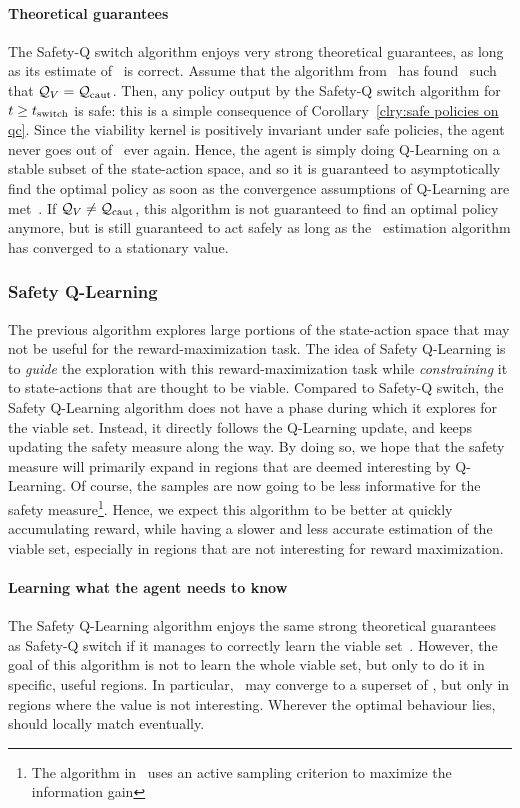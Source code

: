 \paragraph{Theoretical guarantees} The Safety-Q switch algorithm enjoys very strong theoretical guarantees, as long as its estimate of \QV~is correct. Assume that the algorithm from~\cite{heim2020learnable} has found \Qcaut~such that $\mathcal{Q}_{V} = \mathcal{Q}_\text{caut}$. Then, any policy output by the Safety-Q switch algorithm for $t \geq t_\text{switch}$ is safe: this is a simple consequence of Corollary~\ref{clry:safe policies on qc}. Since the viability kernel is positively invariant under safe policies, the agent never goes out of \QV~ever again. Hence, the agent is simply doing Q-Learning on a stable subset of the state-action space, and so it is guaranteed to asymptotically find the optimal policy as soon as the convergence assumptions of Q-Learning are met~\cite{sutton2018reinforcement}. If $\mathcal{Q}_{V}\neq\mathcal{Q}_\text{caut}$, this algorithm is not guaranteed to find an optimal policy anymore, but is still guaranteed to act safely as long as the \Qcaut~estimation algorithm has converged to a stationary value.

\subsubsection{Safety Q-Learning}
The previous algorithm explores large portions of the state-action space that may not be useful for the reward-maximization task. The idea of Safety Q-Learning is to\emph{ guide} the exploration with this reward-maximization task while\emph{ constraining} it to state-actions that are thought to be viable. Compared to Safety-Q switch, the Safety Q-Learning algorithm does not have a phase during which it explores for the viable set. Instead, it directly follows the Q-Learning update, and keeps updating the safety measure along the way. By doing so, we hope that the safety measure will primarily expand in regions that are deemed interesting by Q-Learning. Of course, the samples are now going to be less informative for the safety measure\footnote{The algorithm in~\cite{heim2020learnable} uses an active sampling criterion to maximize the information gain}. Hence, we expect this algorithm to be better at quickly accumulating reward, while having a slower and less accurate estimation of the viable set, especially in regions that are not interesting for reward maximization.%
\paragraph{Learning what the agent needs to know}The Safety Q-Learning algorithm enjoys the same strong theoretical guarantees as Safety-Q switch if it manages to correctly learn the viable set~\QV. However, the goal of this algorithm is not to learn the whole viable set, but only to do it in specific, useful regions. In particular, \Qcaut~may converge to a superset of \QV, but only in regions where the value is not interesting. Wherever the optimal behaviour lies, \Qcaut should locally match \QV eventually.

